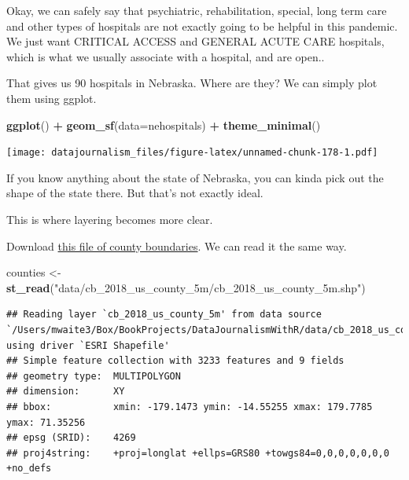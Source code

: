 \documentclass[]{book}
\newenvironment{Shaded}{\begin{snugshade}}{\end{snugshade}}
\newcommand{\DataTypeTok}[1]{\textcolor[rgb]{0.13,0.29,0.53}{#1}}
\newcommand{\KeywordTok}[1]{\textcolor[rgb]{0.13,0.29,0.53}{\textbf{#1}}}
\newcommand{\NormalTok}[1]{#1}
\newcommand{\OperatorTok}[1]{\textcolor[rgb]{0.81,0.36,0.00}{\textbf{#1}}}
\newcommand{\StringTok}[1]{\textcolor[rgb]{0.31,0.60,0.02}{#1}}
\begin{document}
Okay, we can safely say that psychiatric, rehabilitation, special, long term care and other types of hospitals are not exactly going to be helpful in this pandemic. We just want CRITICAL ACCESS and GENERAL ACUTE CARE hospitals, which is what we usually associate with a hospital, and are open..

\begin{Shaded}
\end{Shaded}

That gives us 90 hospitals in Nebraska. Where are they? We can simply plot them using ggplot.

\begin{Shaded}
\begin{Highlighting}[]
\KeywordTok{ggplot}\NormalTok{() }\OperatorTok{+}\StringTok{ }\KeywordTok{geom_sf}\NormalTok{(}\DataTypeTok{data=}\NormalTok{nehospitals) }\OperatorTok{+}\StringTok{ }\KeywordTok{theme_minimal}\NormalTok{()}
\end{Highlighting}
\end{Shaded}

\texttt{[image: datajournalism\_files/figure-latex/unnamed-chunk-178-1.pdf]}

If you know anything about the state of Nebraska, you can kinda pick out the shape of the state there. But that's not exactly ideal.

This is where layering becomes more clear.

Download \href{https://unl.box.com/s/bgvm2x2wzu66mp5o6qykx1flxzz765dj}{this file of county boundaries}. We can read it the same way.

\begin{Shaded}
\begin{Highlighting}[]
\NormalTok{counties <-}\StringTok{ }\KeywordTok{st_read}\NormalTok{(}\StringTok{"data/cb_2018_us_county_5m/cb_2018_us_county_5m.shp"}\NormalTok{)}
\end{Highlighting}
\end{Shaded}

\begin{verbatim}
## Reading layer `cb_2018_us_county_5m' from data source `/Users/mwaite3/Box/BookProjects/DataJournalismWithR/data/cb_2018_us_county_5m/cb_2018_us_county_5m.shp' using driver `ESRI Shapefile'
## Simple feature collection with 3233 features and 9 fields
## geometry type:  MULTIPOLYGON
## dimension:      XY
## bbox:           xmin: -179.1473 ymin: -14.55255 xmax: 179.7785 ymax: 71.35256
## epsg (SRID):    4269
## proj4string:    +proj=longlat +ellps=GRS80 +towgs84=0,0,0,0,0,0,0 +no_defs
\end{verbatim}
\end{document}
